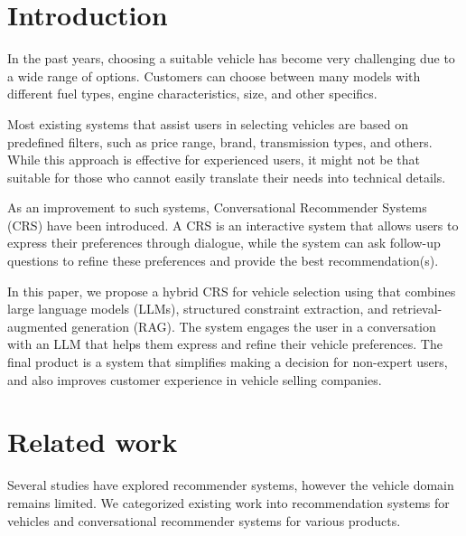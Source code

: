\documentclass[fleqn,moreauthors,10pt]{ds_report}
\affiliation{\textit{Advisors: Aleš Žagar}}
\begin{document}
\flushbottom 

\maketitle 

\thispagestyle{empty} 


\section*{Introduction}
In the past years, choosing a suitable vehicle has become very challenging due to a wide range of options. Customers can choose between many models with different fuel types, engine characteristics, size, and other specifics. 

Most existing systems that assist users in selecting vehicles are based on predefined filters, such as price range, brand, transmission types, and others. While this approach is effective for experienced users, it might not be that suitable for those who cannot easily translate their needs into technical details.

As an improvement to such systems, Conversational Recommender Systems (CRS) have been introduced. A CRS is an interactive system that allows users to express their preferences through dialogue, while the system can ask follow-up questions to refine these preferences and provide the best recommendation(s). 

In this paper, we propose a hybrid CRS for vehicle selection using that combines large 
language models (LLMs), structured constraint extraction, and retrieval-augmented generation (RAG). 
The system engages the user in a conversation with an LLM that helps them express and refine their vehicle preferences.
The final product is a system that simplifies making a 
decision for non-expert users, and also improves customer experience in vehicle selling companies.



\section*{Related work}
Several studies have explored recommender systems, however the vehicle domain remains limited. We categorized existing work into recommendation systems for vehicles and conversational recommender systems for various products.
\end{document}

